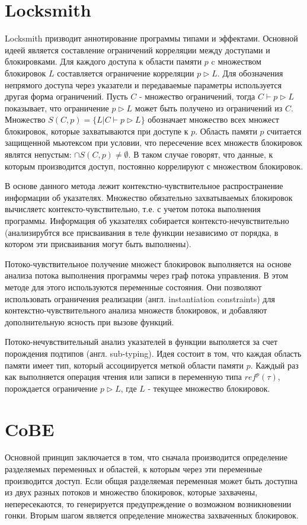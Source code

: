 \section{Locksmith}
Locksmith призводит аннотирование программы типами и эффектами. Основной идеей является составление ограничений корреляции между доступами и блокировками. Для каждого доступа к области памяти $p$ c множеством блокировок $L$ составляется ограничение корреляции $p \triangleright L$. Для обозначения непрямого доступа через указатели и передаваемые параметры используется другая форма ограничений. Пусть $C$ - множество ограничений, тогда $C \vdash p \triangleright L$ показывает, что ограничение $p \triangleright L$ может быть получено из ограничений из $C$. Множество $S(C, p) = \{L | C \vdash p \triangleright L\}$ обозначает множество всех множест блокировок, которые захватываются при доступе к $p$. Область памяти $p$ считается защищенной мьютексом при условии, что пересечение всех множеств блокировок являтся непустым: $\cap S(C, p) \neq \emptyset$. В таком случае говорят, что данные, к которым производится доступ, постоянно коррелируют с множеством блокировок.

В основе данного метода лежит контекстно-чувствительное распространение информации об указателях. Множество обязательно захватываемых блокировок вычисляетс контексто-чувствительно, т.е. с учетом потока выполнения программы. Информация об указателях собирается контексто-нечувствительно (анализирубтся все присваивания в теле функции независимо от порядка, в котором эти присваивания могут быть выполнены). 

Потоко-чувствительное получение множест блокировок выполняется на основе анализа потока выполнения программы через граф потока управления. В этом методе для этого используются переменные состояния. Они позволяют использовать ограничения реализации (англ. instantiation constraints) для контекстно-чувствительного анализа множеств блокировок, и добавляют дополнительную ясность при вызове функций.

Потоко-нечувствительный анализ указателей в функции выполяется за счет порождения подтипов (англ. sub-typing). Идея состоит в том, что каждая область памяти имеет тип, который ассоциируется меткой области памяти $p$. Каждый раз как выполняется операция чтения или записи в переменную типа $ref^{p}(\tau)$, порождается ограничение $p \triangleright L$, где $L$ - текущее множество блокировок.

\section{CoBE}
Основной принцип заключается в том, что сначала производится определение разделяемых переменных и областей, к которым через эти переменные производится доступ. Если общая разделяемая переменная может быть доступна из двух разных потоков и множество блокировок, которые захвачены, непересекаются, то генерируется предупреждение о возможном возникновении гонки. Вторым шагом является определение множества захваченных блокировок.

